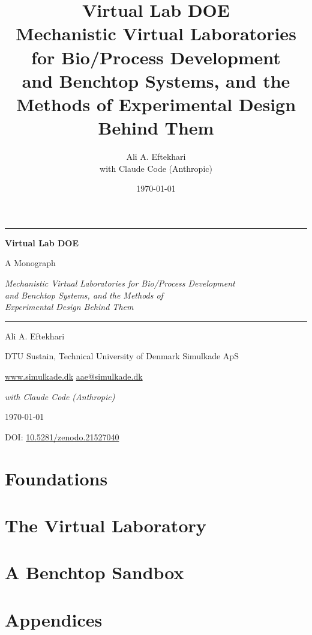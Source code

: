 \documentclass[11pt,openright]{book}
\title{\bfseries Virtual Lab DOE\\[0.4em]
       \large Mechanistic Virtual Laboratories for Bio/Process Development\\
       and Benchtop Systems, and the Methods of Experimental Design Behind Them}
\author{Ali A. Eftekhari \\ with Claude Code (Anthropic)}
\date{\today}
\theoremstyle{definition}
\begin{document}
\begin{titlepage}
\centering
\vspace*{2cm}
{\color{accent}\rule{\linewidth}{1.2pt}}\par\vspace{1.2em}
{\Huge\bfseries Virtual Lab DOE}\par\vspace{0.6em}
{\Large A Monograph}\par\vspace{1.2em}
{\large\itshape Mechanistic Virtual Laboratories for Bio/Process Development\\[0.3em]
and Benchtop Systems, and the Methods of\\[0.3em]
Experimental Design Behind Them}\par\vspace{1em}
{\color{accent}\rule{\linewidth}{1.2pt}}\par
\vfill
{\large Ali A. Eftekhari}\par\vspace{0.25em}
{\normalsize DTU Sustain, Technical University of Denmark \;\textbullet\; Simulkade ApS}\par\vspace{0.15em}
{\normalsize \href{https://www.simulkade.dk}{www.simulkade.dk} \;\textbullet\; \href{mailto:aae@simulkade.dk}{aae@simulkade.dk}}\par\vspace{0.5em}
{\normalsize\itshape with Claude Code (Anthropic)}\par\vspace{0.4em}
{\normalsize \today}\par\vspace{0.4em}
{\small DOI: \href{https://doi.org/10.5281/zenodo.21527040}{10.5281/zenodo.21527040}}\par
\vspace{2cm}
\end{titlepage}

\frontmatter
{}

\cleardoublepage

\cleardoublepage

\cleardoublepage
\tableofcontents
\listoffigures

\mainmatter
{}

\part{Foundations}



\part{The Virtual Laboratory}




\part{A Benchtop Sandbox}


\appendix
\part{Appendices}


\backmatter

\end{document}
